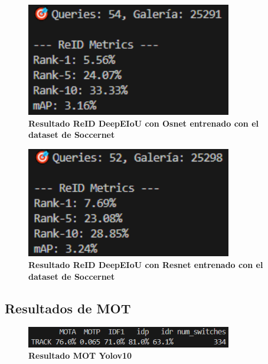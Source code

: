\documentclass[12pt, a4paper, twoside]{article}
\begin{document}
 	\begin{figure}[H]
 		\centering
 		\includegraphics[width=0.8\textwidth]{image/metricas_reid_deepEIoU_osnet_soccernet}
 		\caption{\textbf{Resultado ReID DeepEIoU con Osnet entrenado con el dataset de Soccernet}}
 		\label{fig:Resultado DeepEIoU con Osnet reid soccernet}
 	\end{figure}
 	
 	\begin{figure}[H]
 		\centering
 		\includegraphics[width=0.8\textwidth]{image/metricas_reid_deepEIoU_resnet_soccernet}
 		\caption{\textbf{Resultado ReID DeepEIoU con Resnet entrenado con el dataset de Soccernet}}
 		\label{fig:Resultado  con Resnet reid soccernet}
 	\end{figure}
 	
 	\subsection{Resultados de MOT}
	
	\begin{figure}[H]
		\centering
		\includegraphics[width=0.8\textwidth]{image/metricas_mot_yolo10}
		\caption{\textbf{Resultado MOT Yolov10}}
		\label{fig:Resultado Yolov10 mot}
	\end{figure}
	
\end{document}

